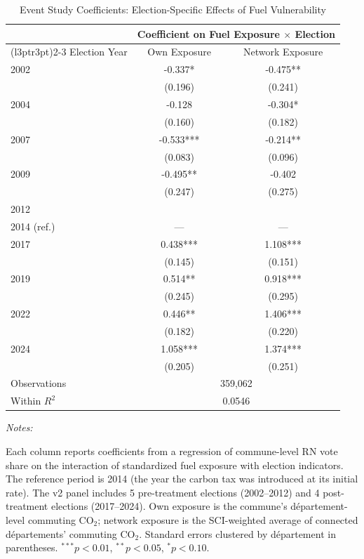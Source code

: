 \begin{table}[!h]
\centering
\caption{Event Study Coefficients: Election-Specific Effects of Fuel Vulnerability}
\centering
\fontsize{10}{12}\selectfont
\begin{threeparttable}
\begin{tabular}[t]{lcc}
\toprule
\multicolumn{1}{c}{ } & \multicolumn{2}{c}{Coefficient on Fuel Exposure $\times$ Election} \\
\cmidrule(l{3pt}r{3pt}){2-3}
Election Year & Own Exposure & Network Exposure\\
\midrule
2002 & -0.337* & -0.475**\\
 & (0.196) & (0.241)\\
2004 & -0.128 & -0.304*\\
 & (0.160) & (0.182)\\
2007 & -0.533*** & -0.214**\\
 & (0.083) & (0.096)\\
2009 & -0.495** & -0.402\\
 & (0.247) & (0.275)\\
2012 &  & \\
2014 (ref.) & --- & ---\\
2017 & 0.438*** & 1.108***\\
 & (0.145) & (0.151)\\
2019 & 0.514** & 0.918***\\
 & (0.245) & (0.295)\\
2022 & 0.446** & 1.406***\\
 & (0.182) & (0.220)\\
2024 & 1.058*** & 1.374***\\
 & (0.205) & (0.251)\\
\midrule Observations & \multicolumn{2}{c}{359,062} \\
Within $R^2$ & \multicolumn{2}{c}{0.0546} \\
\bottomrule
\end{tabular}
\begin{tablenotes}
\item \textit{Notes:} 
\item Each column reports coefficients from a regression of commune-level RN vote share on the interaction of standardized fuel exposure with election indicators. The reference period is 2014 (the year the carbon tax was introduced at its initial rate). The v2 panel includes 5 pre-treatment elections (2002--2012) and 4 post-treatment elections (2017--2024). Own exposure is the commune's d\'{e}partement-level commuting CO$_2$; network exposure is the SCI-weighted average of connected d\'{e}partements' commuting CO$_2$. Standard errors clustered by d\'{e}partement in parentheses. $^{***}p<0.01$, $^{**}p<0.05$, $^{*}p<0.10$.
\end{tablenotes}
\end{threeparttable}
\end{table}
